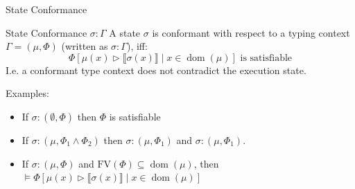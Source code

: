 \documentclass{sdqbeamer}
\newcommand{\bbracket}[1]{\llbracket #1 \rrbracket}
\DeclareMathOperator{\dom}{dom}
\begin{document}
\begin{frame}[fragile]{State Conformance}
  \begin{greenblock}{State Conformance $\sigma : \Gamma$}
    A state $\sigma$ is conformant with respect to a typing context $\Gamma = (\mu, \Phi)$ (written as $\sigma : \Gamma$), iff:
    $$
      \Phi[\mu(x) \triangleright \bbracket{\sigma(x)} \mid x \in \dom(\mu)] \text{ is satisfiable}
    $$
    I.e. a conformant type context does not contradict the execution state.
  \end{greenblock}
  Examples:
  \begin{itemize}
    \item If $\sigma : (\emptyset, \Phi)$ then $\Phi$ is satisfiable
    \item If $\sigma : (\mu, \Phi_1 \wedge \Phi_2)$ then $\sigma : (\mu, \Phi_1)$ and $\sigma : (\mu, \Phi_1)$.
    \item If $\sigma : (\mu, \Phi)$ and $\text{FV}(\Phi) \subseteq \dom(\mu)$, then $\vDash \Phi[\mu(x) \triangleright \bbracket{\sigma(x)} \mid x \in \dom(\mu)]$
  \end{itemize}
\end{frame}
\end{document}
